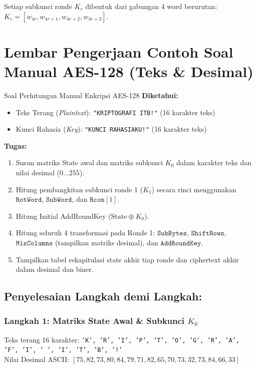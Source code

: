 \documentclass[11pt,a4paper]{article}
\begin{document}
Setiap subkunci ronde $K_r$ dibentuk dari gabungan 4 word berurutan: $K_r = [w_{4r}, w_{4r+1}, w_{4r+2}, w_{4r+3}]$.

\newpage
\section{Lembar Pengerjaan Contoh Soal Manual AES-128 (Teks \& Desimal)}

\begin{problembox}{Soal Perhitungan Manual Enkripsi AES-128}
\textbf{Diketahui:}
\begin{itemize}[leftmargin=*]
    \item Teks Terang (\textit{Plaintext}): \texttt{"KRIPTOGRAFI ITB!"} (16 karakter teks)
    \item Kunci Rahasia (\textit{Key}): \texttt{"KUNCI RAHASIAKU!"} (16 karakter teks)
\end{itemize}
\textbf{Tugas:}
\begin{enumerate}[leftmargin=*]
    \item Susun matriks State awal dan matriks subkunci $K_0$ dalam karakter teks dan nilai desimal ($0 \dots 255$).
    \item Hitung pembangkitan subkunci ronde 1 ($K_1$) secara rinci menggunakan $\mathtt{RotWord}$, $\mathtt{SubWord}$, dan $\mathtt{Rcon}[1]$.
    \item Hitung Initial AddRoundKey ($\text{State} \oplus K_0$).
    \item Hitung seluruh 4 transformasi pada Ronde 1: $\mathtt{SubBytes}$, $\mathtt{ShiftRows}$, $\mathtt{MixColumns}$ (tampilkan matriks desimal), dan $\mathtt{AddRoundKey}$.
    \item Tampilkan tabel rekapitulasi state akhir tiap ronde dan ciphertext akhir dalam desimal dan biner.
\end{enumerate}
\end{problembox}

\subsection*{Penyelesaian Langkah demi Langkah:}

\subsubsection*{Langkah 1: Matriks State Awal \& Subkunci $K_0$}
Teks terang 16 karakter: \texttt{'K', 'R', 'I', 'P', 'T', 'O', 'G', 'R', 'A', 'F', 'I', ' ', 'I', 'T', 'B', '!'} \\
Nilai Desimal ASCII: $[75, 82, 73, 80, 84, 79, 71, 82, 65, 70, 73, 32, 73, 84, 66, 33]$
\end{document}
